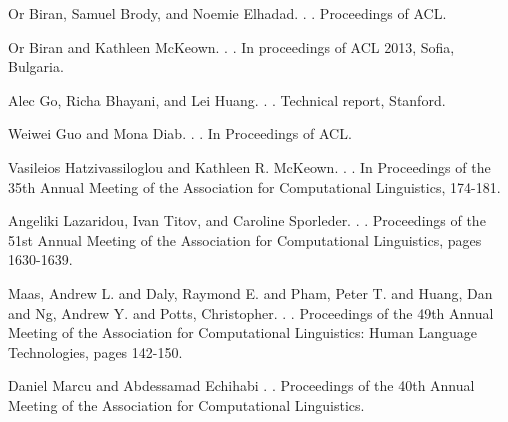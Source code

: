 \documentclass[11pt,letterpaper]{article}
\begin{document}
\begin{thebibliography}{}

Or Biran, Samuel Brody, and Noemie Elhadad.
.
.
\newblock Proceedings of ACL.

Or Biran and Kathleen McKeown. 
.
.
\newblock  In proceedings of ACL 2013, Sofia, Bulgaria.

Alec Go, Richa Bhayani, and Lei Huang.
.
.
\newblock Technical report, Stanford.

Weiwei Guo and Mona Diab.
.
.
\newblock  In Proceedings of ACL.

Vasileios Hatzivassiloglou and Kathleen R. McKeown. 
.
. 
 In Proceedings of the 35th Annual Meeting of the Association for Computational Linguistics, 174-181.

Angeliki Lazaridou, Ivan Titov, and Caroline Sporleder.
.
.
\newblock Proceedings of the 51st Annual Meeting of the Association for Computational Linguistics, pages 1630-1639.

Maas, Andrew L.  and  Daly, Raymond E.  and  Pham, Peter T.  and  Huang, Dan  and  Ng, Andrew Y.  and  Potts, Christopher.
.
.
\newblock Proceedings of the 49th Annual Meeting of the Association for Computational Linguistics: Human Language Technologies, pages 142-150.

Daniel Marcu and Abdessamad Echihabi
.
.
\newblock Proceedings of the 40th Annual Meeting of the Association for Computational Linguistics.


\end{thebibliography}
\end{document}
